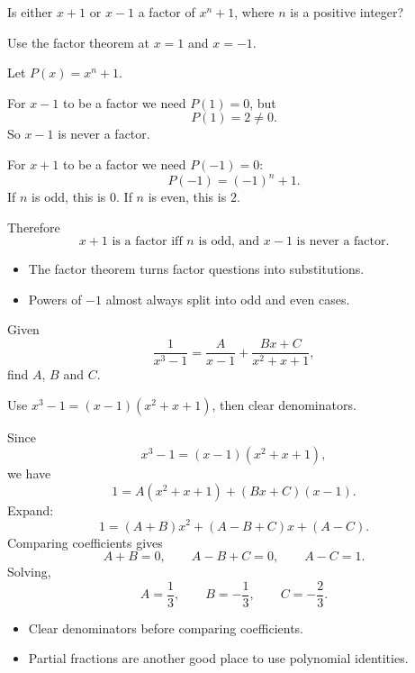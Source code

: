 \begin{problem}[Factors of $x^n+1$]
Is either $x+1$ or $x-1$ a factor of $x^n+1$, where $n$ is a positive integer?
\end{problem}

\begin{hintbox}
Use the factor theorem at $x=1$ and $x=-1$.
\end{hintbox}

\begin{solution}
Let $P(x)=x^n+1$.

For $x-1$ to be a factor we need $P(1)=0$, but
\[
P(1)=2\ne 0.
\]
So $x-1$ is never a factor.

For $x+1$ to be a factor we need $P(-1)=0$:
\[
P(-1)=(-1)^n+1.
\]
If $n$ is odd, this is $0$. If $n$ is even, this is $2$.

Therefore
\[
\boxed{x+1\text{ is a factor iff }n\text{ is odd, and }x-1\text{ is never a factor}.}
\]
\end{solution}

\begin{takeaways}
\begin{itemize}[leftmargin=*]
\item The factor theorem turns factor questions into substitutions.
\item Powers of $-1$ almost always split into odd and even cases.
\end{itemize}
\end{takeaways}

\begin{problem}
Given
\[
\frac{1}{x^3-1}=\frac{A}{x-1}+\frac{Bx+C}{x^2+x+1},
\]
find $A$, $B$ and $C$.
\end{problem}

\begin{hintbox}
Use $x^3-1=(x-1)(x^2+x+1)$, then clear denominators.
\end{hintbox}

\begin{solution}
Since
\[
x^3-1=(x-1)(x^2+x+1),
\]
we have
\[
1=A(x^2+x+1)+(Bx+C)(x-1).
\]
Expand:
\[
1=(A+B)x^2+(A-B+C)x+(A-C).
\]
Comparing coefficients gives
\[
A+B=0,\qquad A-B+C=0,\qquad A-C=1.
\]
Solving,
\[
\boxed{A=\frac13,\qquad B=-\frac13,\qquad C=-\frac23.}
\]
\end{solution}

\begin{takeaways}
\begin{itemize}[leftmargin=*]
\item Clear denominators before comparing coefficients.
\item Partial fractions are another good place to use polynomial identities.
\end{itemize}
\end{takeaways}

